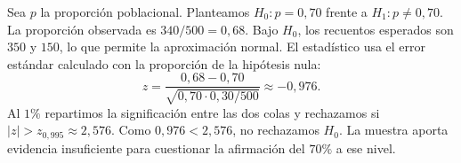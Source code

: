 Sea $p$ la proporción poblacional. Planteamos $H_0:p=0{,}70$ frente a $H_1:p\ne 0{,}70$. La proporción observada es $340/500=0{,}68$. Bajo $H_0$, los recuentos esperados son $350$ y $150$, lo que permite la aproximación normal. El estadístico usa el error estándar calculado con la proporción de la hipótesis nula:
\[
z=\frac{0{,}68-0{,}70}{\sqrt{0{,}70\cdot0{,}30/500}}\approx-0{,}976.
\]
Al $1\%$ repartimos la significación entre las dos colas y rechazamos si $|z|>z_{0{,}995}\approx2{,}576$. Como $0{,}976<2{,}576$, no rechazamos $H_0$. La muestra aporta evidencia insuficiente para cuestionar la afirmación del $70\%$ a ese nivel.
